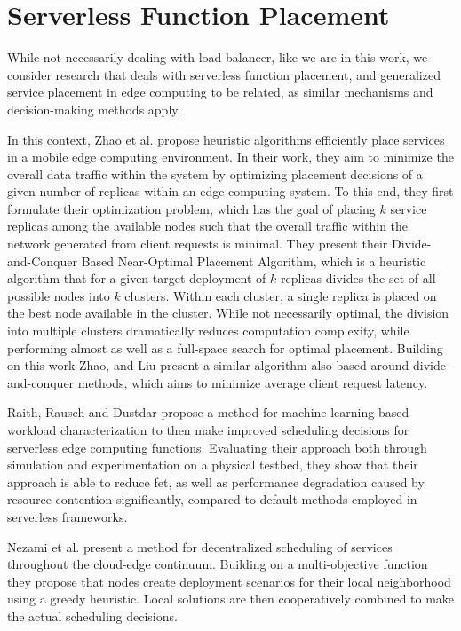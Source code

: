 \section{Serverless Function Placement}
While not necessarily dealing with load balancer, like we are in this work, we consider research that deals with serverless function placement, and generalized service placement in edge computing to be related, as similar mechanisms and decision-making methods apply.

In this context, Zhao et al. \cite{zhaoOptimalPlacementVirtual2017} propose heuristic algorithms efficiently place services in a mobile edge computing environment.
In their work, they aim to minimize the overall data traffic within the system by optimizing placement decisions of a given number of replicas within an edge computing system.
To this end, they first formulate their optimization problem, which has the goal of placing $k$ service replicas among the available nodes such that the overall traffic within the network generated from client requests is minimal.
They present their Divide-and-Conquer Based Near-Optimal Placement Algorithm\cite{zhaoOptimalPlacementVirtual2017}, which is a heuristic algorithm that for a given target deployment of $k$ replicas divides the set of all possible nodes into $k$ clusters.
Within each cluster, a single replica is placed on the best node available in the cluster.
While not necessarily optimal, the division into multiple clusters dramatically reduces computation complexity, while performing almost as well as a full-space search for optimal placement.
Building on this work Zhao, and Liu\cite{zhaoOptimalPlacementVirtual2018} present a similar algorithm also based around divide-and-conquer methods, which aims to minimize average client request latency.

Raith, Rausch and Dustdar\cite{philipp-da} propose a method for machine-learning based workload characterization to then make improved scheduling decisions for serverless edge computing functions.
Evaluating their approach both through simulation and experimentation on a physical testbed, they show that their approach is able to reduce \gls{fet}, as well as performance degradation caused by resource contention significantly, compared to default methods employed in serverless frameworks\cite{philipp-da}.

Nezami et al.\cite{nezamiDecentralizedEdgetoCloudLoad2021} present a method for decentralized scheduling of services throughout the cloud-edge continuum.
Building on a multi-objective function they propose that nodes create deployment scenarios for their local neighborhood using a greedy heuristic.
Local solutions are then cooperatively combined to make the actual scheduling decisions.

